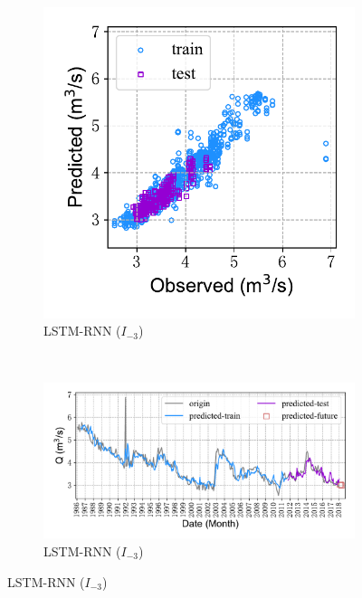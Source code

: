 \begin{figure}[!htbp]
\begin{subfigure}[b]{0.615\textwidth}
  \end{subfigure}
  \\
  \begin{subfigure}[b]{0.305\textwidth}
    \includegraphics[width=\textwidth]{Img/chap4_spr/out3/spr_scatter_in_3_out_3_lstm.pdf}
    \vspace{-1.2cm}
    \caption{LSTM-RNN ($I_{-3}$)}
    \label{fig:spr_scatter_in_3_out_3_lstm}
  \end{subfigure}
  ~
  \begin{subfigure}[b]{0.615\textwidth}
    \includegraphics[width=\textwidth]{Img/chap4_spr/out3/spr_series_in_3_out_3_lstm.pdf}
    \vspace{-1.2cm}
    \caption{LSTM-RNN ($I_{-3}$)}

\end{subfigure}
\end{figure}
